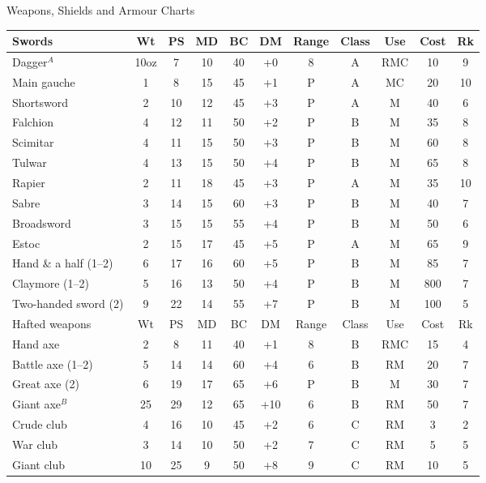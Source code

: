 \begin{Tables}{Weapons, Shields and Armour Charts}
\begingroup

\def\arraystretch{0.80}
\begin{tabularx}{\linewidth}{Xcccccccccc} \toprule
\rowcolor{BurntOrange}
Swords			& Wt	& PS	& MD	& BC	& DM	& Range	& Class	& Use	& Cost	& Rk	\\ \midrule
Dagger$^A$		& 10oz	& 7	& 10	& 40	& +0 	& 8	& A	& RMC	& 10	& 9	\\ \hline
Main gauche		& 1	& 8	& 15	& 45	& +1	& P	& A	& MC	& 20	& 10	\\ \hline
Shortsword		& 2	& 10	& 12	& 45	& +3	& P	& A	& M	& 40	& 6	\\ \hline
Falchion		& 4	& 12	& 11	& 50	& +2	& P	& B	& M	& 35	& 8	\\ \hline
Scimitar		& 4	& 11	& 15	& 50	& +3	& P	& B	& M	& 60	& 8	\\ \hline
Tulwar			& 4	& 13	& 15	& 50	& +4	& P	& B	& M	& 65	& 8	\\ \hline
Rapier			& 2	& 11	& 18	& 45	& +3	& P	& A	& M	& 35	& 10	\\ \hline
Sabre			& 3	& 14	& 15	& 60	& +3	& P	& B	& M	& 40	& 7	\\ \hline
Broadsword		& 3	& 15	& 15	& 55	& +4	& P	& B	& M	& 50	& 6	\\ \hline
Estoc			& 2	& 15	& 17	& 45	& +5	& P	& A	& M	& 65	& 9	\\ \hline
Hand \& a half (1--2)	& 6	& 17	& 16	& 60	& +5	& P	& B	& M	& 85	& 7	\\ \hline
Claymore (1--2)		& 5	& 16	& 13	& 50	& +4	& P	& B	& M	& 800	& 7	\\ \hline
Two-handed sword (2)	& 9	& 22	& 14	& 55	& +7	& P	& B	& M	& 100	& 5	\\ \midrule
\rowcolor{BurntOrange}
Hafted weapons		& Wt	& PS	& MD	& BC	& DM	& Range	& Class	& Use	& Cost	& Rk	\\ \midrule
Hand axe		& 2	& 8	& 11	& 40	& +1	& 8	& B	& RMC	& 15	& 4	\\ \hline
Battle axe (1--2)	& 5 	& 14	& 14	& 60	& +4	& 6	& B	& RM	& 20	& 7	\\ \hline
Great axe (2)		& 6	& 19	& 17	& 65	& +6	& P	& B	& M	& 30	& 7	\\ \hline
Giant axe$^B$		& 25	& 29	& 12	& 65	& +10	& 6	& B	& RM	& 50	& 7	\\ \hline
Crude club		& 4	& 16	& 10	& 45	& +2	& 6	& C	& RM	& 3	& 2	\\ \hline
War club		& 3	& 14	& 10	& 50	& +2	& 7	& C	& RM	& 5	& 5	\\ \hline
Giant club		& 10	& 25	& 9	& 50	& +8	& 9	& C	& RM	& 10	& 5	\\ \hline

\end{tabularx}
\end{Tables}
